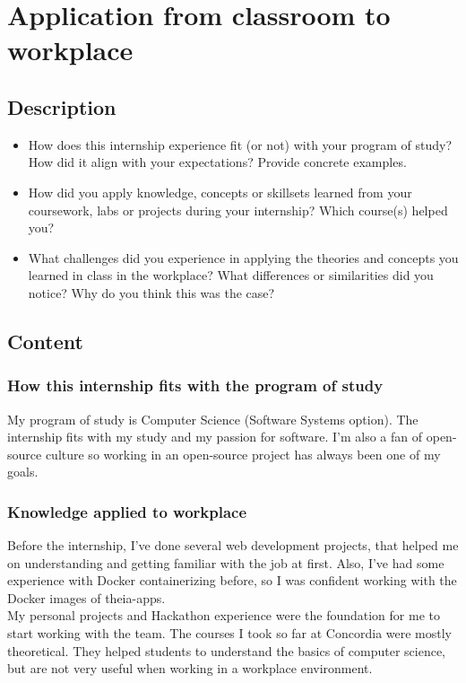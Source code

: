 \newpage
\section{Application from classroom to workplace}

\subsection{Description}

\begin{itemize}
    \item How does this internship experience fit (or not) with your program of study? How did it align with your expectations? Provide concrete examples.
    \item How did you apply knowledge, concepts or skillsets learned from your coursework, labs or projects during your internship? Which course(s) helped you?
    \item What challenges did you experience in applying the theories and concepts you learned in class in the workplace? What differences or similarities did you notice? Why do you think this was the case?
\end{itemize}

\subsection{Content}

\subsubsection{How this internship fits with the program of study}
My program of study is Computer Science (Software Systems option). The internship fits with my study and my passion for software.
I'm also a fan of open-source culture so working in an open-source project has always been one of my goals.

\subsubsection{Knowledge applied to workplace}
Before the internship, I've done several web development projects, that helped me on understanding and getting familiar with the job at first. Also, I've had some experience with Docker containerizing before, so I was confident working with the Docker images of theia-apps.
\\
My personal projects and Hackathon experience were the foundation for me to start working with the team.
The courses I took so far at Concordia were mostly theoretical.
They helped students to understand the basics of computer science, but are not very useful when working in a workplace environment.
